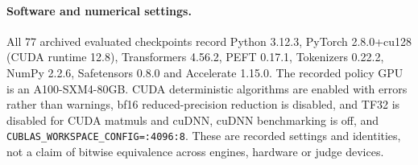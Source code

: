 \documentclass[11pt]{article}
\begin{document}
\paragraph{Software and numerical settings.} All 77 archived evaluated
checkpoints record Python 3.12.3, PyTorch 2.8.0+cu128 (CUDA runtime 12.8),
Transformers 4.56.2, PEFT 0.17.1, Tokenizers 0.22.2, NumPy 2.2.6,
Safetensors 0.8.0 and Accelerate 1.15.0. The recorded policy GPU is an
A100-SXM4-80GB. CUDA deterministic algorithms are enabled with errors rather
than warnings, bf16 reduced-precision reduction is disabled, and TF32 is disabled for CUDA matmuls and cuDNN, cuDNN benchmarking
is off, and \texttt{CUBLAS\_WORKSPACE\_CONFIG=:4096:8}. These are recorded
settings and identities, not a claim of bitwise equivalence across engines,
hardware or judge devices.
\end{document}
